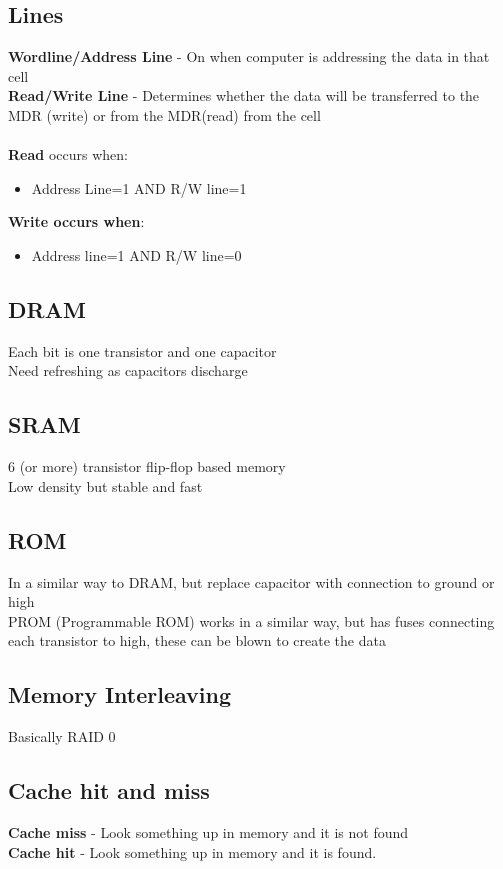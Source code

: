 \documentclass{article}[18pt]
\begin{document}
\subsection{Lines}
\textbf{Wordline/Address Line} - On when computer is addressing the data in that cell\\
\textbf{Read/Write Line} - Determines whether the data will be transferred to the MDR (write) or from the MDR(read) from the cell\\
\\
\textbf{Read} occurs when:
\begin{itemize}
	\item Address Line=1 AND R/W line=1
\end{itemize}
\textbf{Write occurs when}:
\begin{itemize}
	\item Address line=1 AND R/W line=0
\end{itemize}
\subsection{DRAM}
Each bit is one transistor and one capacitor\\
Need refreshing as capacitors discharge
\subsection{SRAM}
6 (or more) transistor flip-flop based memory\\
Low density but stable and fast
\subsection{ROM}
In a similar way to DRAM, but replace capacitor with connection to ground or high\\
PROM (Programmable ROM) works in a similar way, but has fuses connecting each transistor to high, these can be blown to create the data
\subsection{Memory Interleaving}
Basically RAID 0
\subsection{Cache hit and miss}
\textbf{Cache miss} - Look something up in memory and it is not found\\
\textbf{Cache hit} - Look something up in memory and it is found.
\end{document}
